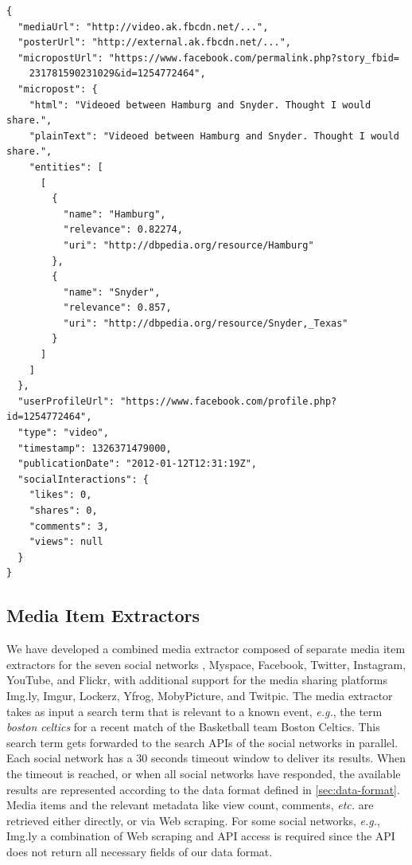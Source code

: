 \begin{lstlisting}[caption={Sample output of the media extractor
  showing a Facebook post processed with named entity extraction
  and disambiguation (slightly edited for legibility).},
  label={code:facebook}]
{
  "mediaUrl": "http://video.ak.fbcdn.net/...",
  "posterUrl": "http://external.ak.fbcdn.net/...",
  "micropostUrl": "https://www.facebook.com/permalink.php?story_fbid=
    231781590231029&id=1254772464",
  "micropost": {
    "html": "Videoed between Hamburg and Snyder. Thought I would share.",
    "plainText": "Videoed between Hamburg and Snyder. Thought I would share.",
    "entities": [
      [
        {
          "name": "Hamburg",
          "relevance": 0.82274,
          "uri": "http://dbpedia.org/resource/Hamburg"
        },
        {
          "name": "Snyder",
          "relevance": 0.857,
          "uri": "http://dbpedia.org/resource/Snyder,_Texas"
        }
      ]
    ]
  },
  "userProfileUrl": "https://www.facebook.com/profile.php?id=1254772464",
  "type": "video",
  "timestamp": 1326371479000,
  "publicationDate": "2012-01-12T12:31:19Z",
  "socialInteractions": {
    "likes": 0,
    "shares": 0,
    "comments": 3,
    "views": null
  }
}
\end{lstlisting}

\subsection{Media Item Extractors}
\label{sec:media-item-extractors}

We have developed a combined media extractor composed of
separate media item extractors for the seven social networks
\googleplus, Myspace, Facebook, Twitter, Instagram, YouTube,
and Flickr, with additional support for the media sharing
platforms Img.ly, Imgur, Lockerz, Yfrog, MobyPicture, and Twitpic.
The media extractor takes as input a search term that is relevant
to a known event, \emph{e.g.}, the term \emph{boston celtics}
for a recent match of the Basketball team Boston Celtics.
This search term gets forwarded to the search APIs
of the social networks in parallel.
Each social network has a 30 seconds timeout window
to deliver its results.
When the timeout is reached,
or when all social networks have responded,
the available results are represented according to the data format
defined in \autoref{sec:data-format}.
Media items and the relevant metadata like view count, comments,
\emph{etc.} are retrieved either directly, or via Web scraping.
For some social networks, \emph{e.g.}, Img.ly
a combination of Web scraping and API access is required
since the API does not return all necessary fields
of our data format.

